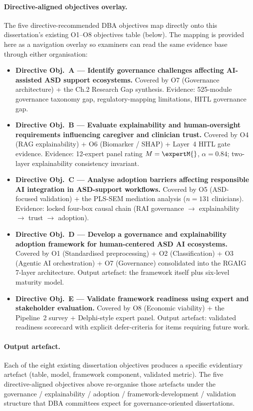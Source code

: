 \paragraph{Directive-aligned objectives overlay.}
\label{para:objectives_lens}
The five directive-recommended DBA objectives map directly onto this dissertation's existing O1--O8 objectives table (below). The mapping is provided here as a navigation overlay so examiners can read the same evidence base through either organisation:

\begin{itemize}[leftmargin=*, itemsep=3pt]
    \item \textbf{Directive Obj.~A — Identify governance challenges affecting AI-assisted ASD support ecosystems.} Covered by O7 (Governance architecture) + the Ch.2 Research Gap synthesis. Evidence: 525-module governance taxonomy gap, regulatory-mapping limitations, HITL governance gap.
    \item \textbf{Directive Obj.~B — Evaluate explainability and human-oversight requirements influencing caregiver and clinician trust.} Covered by O4 (RAG explainability) + O6 (Biomarker / SHAP) + Layer~4 HITL gate evidence. Evidence: 12-expert panel rating $M = \expertM{}$, $\alpha = 0.84$; two-layer explainability consistency invariant.
    \item \textbf{Directive Obj.~C — Analyse adoption barriers affecting responsible AI integration in ASD-support workflows.} Covered by O5 (ASD-focused validation) + the PLS-SEM mediation analysis ($n = 131$ clinicians). Evidence: locked four-box causal chain (RAI governance $\to$ explainability $\to$ trust $\to$ adoption).
    \item \textbf{Directive Obj.~D — Develop a governance and explainability adoption framework for human-centered ASD AI ecosystems.} Covered by O1 (Standardised preprocessing) + O2 (Classification) + O3 (Agentic AI orchestration) + O7 (Governance) consolidated into the RGAIG 7-layer architecture. Output artefact: the framework itself plus six-level maturity model.
    \item \textbf{Directive Obj.~E — Validate framework readiness using expert and stakeholder evaluation.} Covered by O8 (Economic viability) + the Pipeline~2 survey + Delphi-style expert panel. Output artefact: validated readiness scorecard with explicit defer-criteria for items requiring future work.
\end{itemize}

\paragraph{Output artefact.} Each of the eight existing dissertation objectives produces a specific evidentiary artefact (table, model, framework component, validated metric). The five directive-aligned objectives above re-organise those artefacts under the governance / explainability / adoption / framework-development / validation structure that DBA committees expect for governance-oriented dissertations.

